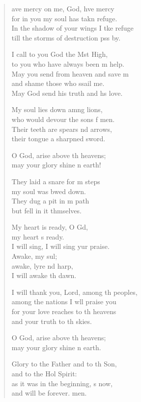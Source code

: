 \settowidth{\versewidth}{I will thank you, Lord, among the peoples, *}
\begin{verse}%
  \begin{patverse}
    ave mercy on me, God, hve mercy\Med\\
for in you my soul has takn refuge.\\
In the shadow of your wings I tke refuge\Med\\
till the storms of destruction pss by.

I call to you God the Mst High,\Med\\
to you who have always been m help.\\
May you send from heaven and save m\Flex\\
and shame those who ssail me.\Med\\
May God send his truth and h\pointup{\i}s love.

My soul lies down amng lions,\Med\\
who would devour the sons f men.\\
Their teeth are spears nd arrows,\Med\\
their tongue a sharpned sword.

O God, arise above th heavens;\Med\\
may your glory shine n earth!

They laid a snare for m steps\Med\\
my soul was bwed down.\\
They dug a pit in m path\Med\\
but fell in it thmselves.

My heart is ready, O Gd,\Flex\\
my heart \pointup{\i}s ready.\Med\\
I will sing, I will sing yur praise.\\
Awake, my sul;\Flex\\
awake, lyre nd harp,\Med\\
I will awake th dawn.

I will thank you, Lord, among th peoples,\Med\\
among the nations I w\pointup{\i}ll praise you\\
for your love reaches to th heavens\Med\\
and your truth to th skies.

O God, arise above th heavens;\Med\\
may your glory shine n earth.

Glory to the Father and to th Son,\Med\\
and to the Hol Spirit:\\
as it was in the beginning, \pointup{\i}s now,\Med\\
and will be forever. men. 
  \end{patverse}
\end{verse}
